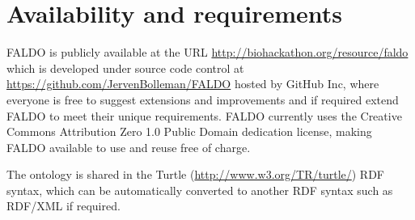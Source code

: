 \section*{Availability and requirements}
FALDO is publicly available at the URL \url{http://biohackathon.org/resource/faldo}
which is developed under source code control at
\url{https://github.com/JervenBolleman/FALDO} hosted by GitHub Inc,
where everyone is free to suggest extensions and improvements and if required extend FALDO to meet their unique requirements.
FALDO currently uses the Creative Commons Attribution Zero 1.0 Public Domain dedication license,
making FALDO available to use and reuse free of charge.

The ontology is shared in the Turtle (\url{http://www.w3.org/TR/turtle/}) RDF syntax,
which can be automatically converted to another RDF syntax such as RDF/XML if required.
